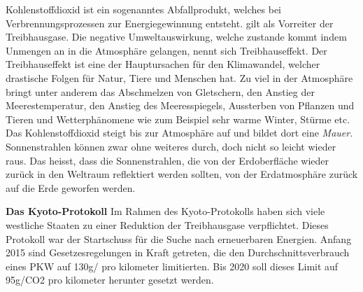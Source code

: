 Kohlenstoffdioxid ist ein sogenanntes Abfallprodukt, welches bei Verbrennungsprozessen zur Energiegewinnung entsteht. 
 gilt als Vorreiter der Treibhausgase.
Die negative Umweltauswirkung, welche zustande kommt indem Unmengen an  in die Atmosphäre gelangen, 
nennt sich Treibhauseffekt. 
Der Treibhauseffekt ist eine der Hauptursachen für den Klimawandel, welcher drastische Folgen für Natur, Tiere und Menschen hat. 
Zu viel  in der Atmosphäre bringt unter anderem das Abschmelzen von Gletschern, 
den Anstieg der Meerestemperatur, den Anstieg des Meeresspiegels, 
Aussterben von Pflanzen und Tieren und Wetterphänomene wie zum Beispiel sehr warme Winter, Stürme etc.
Das Kohlenstoffdioxid steigt bis zur Atmosphäre auf und bildet dort eine \textit{Mauer}.
Sonnenstrahlen können zwar ohne weiteres durch, doch nicht so leicht wieder raus. Das heisst, dass die Sonnenstrahlen,
die von der Erdoberfläche wieder zurück in den Weltraum reflektiert werden sollten, von der Erdatmosphäre zurück auf die Erde geworfen werden.\nextline
 
\textbf{Das Kyoto-Protokoll\newline}
Im Rahmen des Kyoto-Protokolls haben sich viele westliche Staaten zu einer Reduktion der Treibhausgase verpflichtet. 
Dieses Protokoll war der Startschuss für die Suche nach erneuerbaren Energien. 
Anfang 2015 sind Gesetzesregelungen in Kraft getreten, die den Durchschnittsverbrauch eines PKW auf 130g/ pro kilometer limitierten. 
Bis 2020 soll dieses Limit auf 95g/CO2 pro kilometer herunter gesetzt werden.

\clearpage %